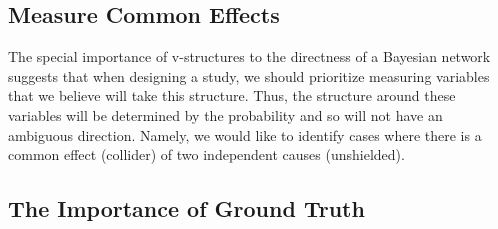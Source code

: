 \documentclass{article}
\begin{document}
	\subsection{Measure Common Effects}
	The special importance of v-structures to the directness of a Bayesian network suggests that when designing a study, we should prioritize measuring variables that we believe will take this structure.
	Thus, the structure around these variables will be determined by the probability and so will not have an ambiguous direction.
	Namely, we would like to identify cases where there is a common effect (collider) of two independent causes (unshielded).
	
	\subsection{The Importance of Ground Truth}
	
	
	
	
	\appendix
	
\end{document}
